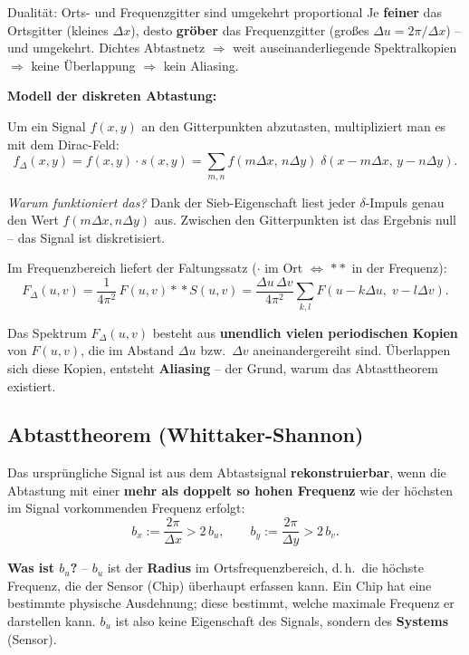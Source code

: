 \documentclass[12pt, a4paper]{article}
\begin{document}
\begin{notebox}{Dualität: Orts- und Frequenzgitter sind umgekehrt proportional}
Je \textbf{feiner} das Ortsgitter (kleines $\Delta x$), desto \textbf{gröber} das Frequenzgitter (großes $\Delta u = 2\pi/\Delta x$) -- und umgekehrt. Dichtes Abtastnetz $\Rightarrow$ weit auseinanderliegende Spektralkopien $\Rightarrow$ keine Überlappung $\Rightarrow$ kein Aliasing.
\end{notebox}

\textbf{Modell der diskreten Abtastung:}

Um ein Signal $f(x,y)$ an den Gitterpunkten abzutasten, multipliziert man es mit dem Dirac-Feld:
\[
  f_\Delta(x,y) = f(x,y)\cdot s(x,y)
  = \sum_{m,n} f(m\Delta x,\,n\Delta y)\;\delta(x-m\Delta x,\,y-n\Delta y).
\]

\textit{Warum funktioniert das?} Dank der Sieb-Eigenschaft \glqq{}liest\grqq{} jeder $\delta$-Impuls genau den Wert $f(m\Delta x, n\Delta y)$ aus. Zwischen den Gitterpunkten ist das Ergebnis null -- das Signal ist diskretisiert.

Im Frequenzbereich liefert der Faltungssatz ($\cdot$ im Ort $\Leftrightarrow$ $\ast\!\ast$ in der Frequenz):
\[
  F_\Delta(u,v)
  = \frac{1}{4\pi^2}\,F(u,v)\ast\!\ast S(u,v)
  = \frac{\Delta u\,\Delta v}{4\pi^2}
    \sum_{k,l} F(u - k\Delta u,\; v - l\Delta v).
\]

Das Spektrum $F_\Delta(u,v)$ besteht aus \textbf{unendlich vielen periodischen Kopien} von $F(u,v)$, die im Abstand $\Delta u$ bzw.\ $\Delta v$ aneinandergereiht sind. Überlappen sich diese Kopien, entsteht \textbf{Aliasing} -- der Grund, warum das Abtasttheorem existiert.

\subsection{Abtasttheorem (Whittaker-Shannon)}

\begin{definitionbox}
  Das ursprüngliche Signal ist aus dem Abtastsignal
  \textbf{rekonstruierbar}, wenn die Abtastung mit einer
  \textbf{mehr als doppelt so hohen Frequenz} wie der höchsten im
  Signal vorkommenden Frequenz erfolgt:
  \[ b_x := \frac{2\pi}{\Delta x} > 2\,b_u, \qquad
     b_y := \frac{2\pi}{\Delta y} > 2\,b_v. \]
\end{definitionbox}

\textbf{Was ist $b_u$?} -- $b_u$ ist der \textbf{Radius} im Ortsfrequenzbereich, d.\,h.\ die höchste Frequenz, die der Sensor (Chip) überhaupt erfassen kann. Ein Chip hat eine bestimmte physische Ausdehnung; diese bestimmt, welche maximale Frequenz er darstellen kann. $b_u$ ist also keine Eigenschaft des Signals, sondern des \textbf{Systems} (Sensor).
\end{document}
